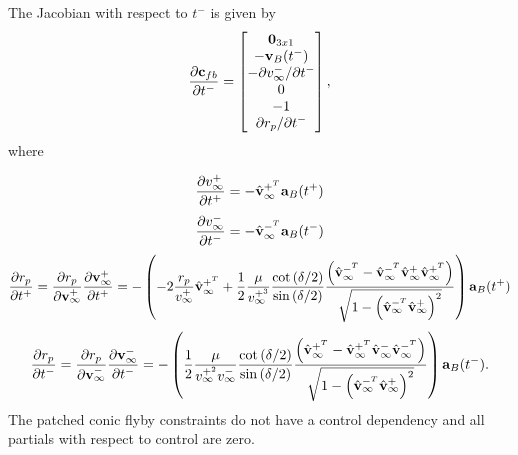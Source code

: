 The Jacobian with respect to $t^-$ is given by
\begin{equation}
\frac{\partial \mathbf{c}_{fb}}{\partial t^-} = 
\begin{bmatrix}
   \mathbf{0}_{3x1}  \\
    -\mathbf{v}_{B}(t^-)  \\
   - \partial v_{\infty}^- / \partial t^- \\
   0  \\
   -1 \\
   \partial r_p / \partial t^- \\
\end{bmatrix},
\end{equation}
%
where

\begin{equation}
	\frac{\partial v_{\infty}^+}{\partial t^+} = - \hat{\mathbf{v}}_{\infty}^{+^T} \mathbf{a}_B(t^+)
\end{equation}
%
\begin{equation}
	\frac{\partial v_{\infty}^-}{\partial t^-} = - \hat{\mathbf{v}}_{\infty}^{-^T} \mathbf{a}_B(t^-)
\end{equation}
%
\begin{equation}
    \frac{\partial r_p}{\partial t^+} = \frac{\partial r_p}{\partial \mathbf{v}_{\infty}^+}\frac{\partial \mathbf{v}_{\infty}^+}{\partial t^+} =  
    - \left(-2\frac{r_p}{v_{\infty}^+}\hat{\mathbf{v}}_{\infty}^{+^T} + \frac{1}{2}\frac{\mu}{v_{\infty}^{+^3}}        \frac{\cot{(\delta/2})}{\sin{(\delta/2)}}     
     \frac{ \left( \hat{\mathbf{v}}_{\infty}^{-^T} - \hat{\mathbf{v}}_{\infty}^{-^T} \hat{\mathbf{v}}_{\infty}^{+} \hat{\mathbf{v}}_{\infty}^{+^T} \right)}{\sqrt{1 - \left(\hat{\mathbf{v}}_{\infty}^{-^T} \hat{\mathbf{v}}_{\infty}^{+}\right)^2}}  \right)\mathbf{a}_B(t^+)
\end{equation}
%
\begin{equation}
    \frac{\partial r_p}{\partial t^-} = \frac{\partial r_p}{\partial \mathbf{v}_{\infty}^-}\frac{\partial \mathbf{v}_{\infty}^-}{\partial t^-} =  -\left( \frac{1}{2}\frac{\mu}{v_{\infty}^{+^2} v_{\infty}^{-}} \frac{\cot{(\delta/2})}{\sin{(\delta/2)}}     
     \frac{ \left( \hat{\mathbf{v}}_{\infty}^{+^T} - \hat{\mathbf{v}}_{\infty}^{+^T} \hat{\mathbf{v}}_{\infty}^{-} \hat{\mathbf{v}}_{\infty}^{-^T} \right)}{\sqrt{1 - \left(\hat{\mathbf{v}}_{\infty}^{-^T} \hat{\mathbf{v}}_{\infty}^{+}\right)^2}}\right)\mathbf{a}_B(t^-).
\end{equation}
%
The patched conic flyby constraints do not have a control dependency and all partials with respect to control are zero.
